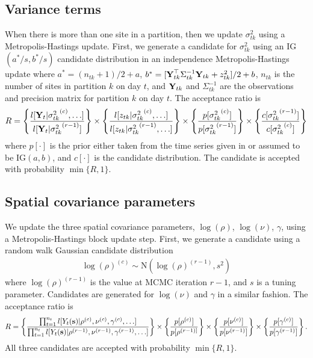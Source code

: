 \documentclass[useAMS,usenatbib,referee]{biomweb}
\begin{document}
\subsection*{Variance terms}
When there is more than one site in a partition, then we update $\sigma^2_{tk}$ using a Metropolis-Hastings update.
First, we generate a candidate for $\sigma^2_{tk}$ using an IG$(a^*/s, b^*/s)$ candidate distribution in an independence Metropolis-Hastings update where $a^* = (n_{tk} + 1) / 2 + a$, $b^* = [\mbox{\bf Y}_{tk}^\top \Sigma^{-1}_{tk} \mbox{\bf Y}_{tk} + z_{tk}^2] / 2 + b$, $n_{tk}$ is the number of sites in partition $k$ on day $t$, and $\mbox{\bf Y}_{tk}$ and $\Sigma^{-1}_{tk}$ are the observations and precision matrix for partition $k$ on day $t$.
The acceptance ratio is
\begin{align*}
  R = \left\{
    \frac{ l[\mbox{\bf Y}_t | {\sigma^2_{tk}}^{(c)}, \ldots] }
         { l[\mbox{\bf Y}_t | {\sigma^2_{tk}}^{(r - 1)}]}
    \right\} \times \left\{
    \frac{ l[z_{tk} | {\sigma^2_{tk}}^{(c)}, \ldots] }
         { l[z_{tk} | {\sigma^2_{tk}}^{(r - 1)}, \ldots] }
    \right\} \times \left\{
    \frac{ p[ {\sigma^2_{tk}}^{(c)} ] }
         { p[ {\sigma^2_{tk}}^{(r - 1)}] }
    \right\} \times \left\{
    \frac{ c[ {\sigma^2_{tk}}^{(r - 1)}] }
         { c[ {\sigma^2_{tk}}^{(c)}]}
    \right\}
\end{align*}
where $p[\cdot]$ is the prior either taken from the time series given in  or assumed to be IG$(a, b)$, and $c[\cdot]$ is the candidate distribution.
The candidate is accepted with probability $\min\{R, 1\}$.

\subsection*{Spatial covariance parameters}
We update the three spatial covariance parameters, $\log(\rho)$, $\log(\nu)$, $\gamma$, using a Metropolis-Hastings block update step.
First, we generate a candidate using a random walk Gaussian candidate distribution
\begin{align*}
	\log(\rho)^{(c)} \sim \text{N}(\log(\rho)^{(r - 1)}, s^2)
\end{align*}
where $\log(\rho)^{(r-1)}$ is the value at MCMC iteration $r - 1$, and $s$ is a tuning parameter.
Candidates are generated for $\log(\nu)$ and $\gamma$ in a similar fashion.
The acceptance ratio is
\begin{align*}
	R = \left\{ \frac{ \prod_{t = 1}^{n_t} l[Y_t(\mbox{\bf s}) | \rho^{(c)}, \nu^{(c)}, \gamma^{(c)}, \ldots] }{\prod_{t = 1}^{n_t} l[Y_t(\mbox{\bf s}) | \rho^{(r-1)}, \nu^{(r-1)}, \gamma^{(r-1)}, \ldots] } \right\} \times \left\{ \frac{ p[\rho^{(c)}] }{ p[\rho^{(r - 1)] } } \right\} \times \left\{ \frac{ p[\nu^{(c)}] }{ p[\nu^{(r - 1)}] } \right\} \times \left\{ \frac{ p[ \gamma^{(c)} ] }{ p[\gamma^{(r - 1)} ] } \right\}.
\end{align*}
All three candidates are accepted with probability $\min\{R, 1\}$.
\end{document}
